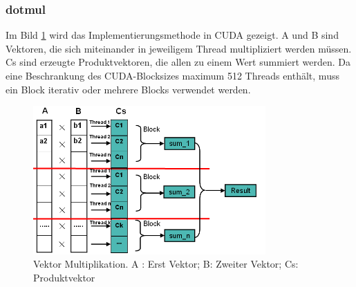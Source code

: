 
\subsubsection{dotmul}

Im Bild \ref{Vektor} wird das Implementierungsmethode in CUDA gezeigt. A und B sind Vektoren, die sich miteinander in jeweiligem Thread multipliziert werden müssen. Cs sind erzeugte Produktvektoren, die allen zu einem Wert summiert werden. Da eine Beschrankung des CUDA-Blocksizes maximum 512 Threads enthält, muss ein Block iterativ oder mehrere Blocks verwendet werden.

\begin{figure}[htbp]
\includegraphics[width=3.5in]{../xby/pic/Vektor}
\caption{Vektor Multiplikation. A : Erst Vektor; B: Zweiter Vektor; Cs: Produktvektor}
\label{Vektor}
\end{figure}